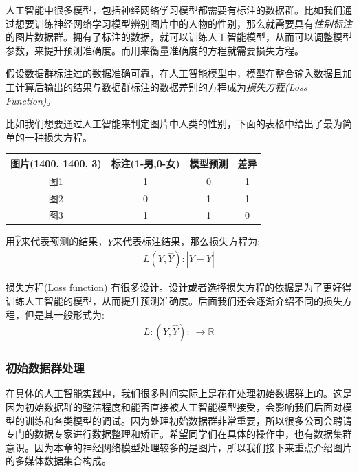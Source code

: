 \documentclass[12pt]{article}
\newcommand{\rn}{\mathbb{R}}
\numberwithin{equation}{section}
\numberwithin{figure}{section}
\begin{document}
人工智能中很多模型，包括神经网络学习模型都需要有标注的数据群。比如我们通过想要训练神经网络学习模型辨别图片中的人物的性别，那么就需要具有\textit{性别标注}的图片数据群。拥有了标注的数据，就可以训练人工智能模型，从而可以调整模型参数，来提升预测准确度。而用来衡量准确度的方程就需要损失方程。

\begin{definition}
	假设数据群标注过的数据准确可靠，在人工智能模型中，模型在整合输入数据且加工计算后输出的结果与数据群标注的数据差别的方程成为\textit{损失方程(Loss Function)}。
\end{definition}

\begin{example}
比如我们想要通过人工智能来判定图片中人类的性别，下面的表格中给出了最为简单的一种损失方程。
\begin{table}[H]
	\centering
	\renewcommand{\arraystretch}{1.5}
	\begin{tabular}{cccc}
	\hline 
		图片(1400, 1400, 3) & 标注(1-男,0-女) & 模型预测 & 差异\\
		\hline 
		图1 & 1 & 0 & 1 \\
		图2 & 0 & 1 & 1 \\
		图3 & 1 & 1 & 0 \\
		\hline 
	\end{tabular}
\end{table}
用$\hat{Y}$来代表预测的结果，$Y$来代表标注结果，那么损失方程为:
\begin{align*}
	L(Y, \hat{Y}): |Y-\hat{Y}| 
\end{align*}
\end{example}

\begin{remark}
损失方程(Loss function) 有很多设计。设计或者选择损失方程的依据是为了更好得训练人工智能的模型，从而提升预测准确度。后面我们还会逐渐介绍不同的损失方程，但是其一般形式为:
\begin{align*}
	L: (Y, \hat{Y}): \ \to \rn 
\end{align*}	
\end{remark}

\subsubsection{初始数据群处理}

在具体的人工智能实践中，我们很多时间实际上是花在处理初始数据群上的。这是因为初始数据群的整洁程度和能否直接被人工智能模型接受，会影响我们后面对模型的训练和各类模型的调试。因为处理初始数据群非常重要，所以很多公司会聘请专门的数据专家进行数据整理和矫正。希望同学们在具体的操作中，也有数据集群意识。因为本章的神经网络模型处理较多的是图片，所以我们接下来重点介绍图片的多媒体数据集合构成。
\end{document}
